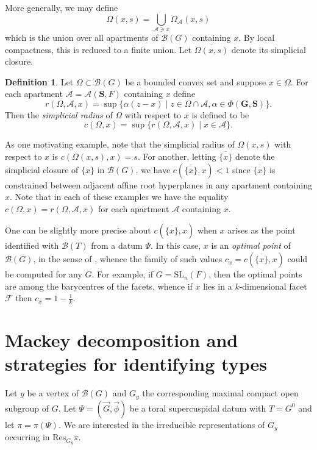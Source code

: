 \documentclass[12pt]{amsart}
\newcommand{\Res}{\mathrm{Res}} %
\newcommand{\ratk}{F}
\newcommand{\SL}{\mathrm{SL}}
\newcommand{\GG}{\mathbf{G}} %
\newcommand{\Stor}{\mathbf{S}} %
\newcommand{\Bset}{\Omega}
\newcommand{\apart}{{\mathcal{A}}}
\newcommand{\buil}{\mathcal{B}}
\newcommand{\F}{\mathcal{F}} %
\theoremstyle{plain}
\theoremstyle{definition}
\newtheorem{definition}[theorem]{Definition}
\theoremstyle{remark}
\numberwithin{equation}{section}
\numberwithin{figure}{section}
\begin{document}
More generally, we may define
$$
\Bset(x,s) = \bigcup_{\apart \ni x} \Omega_\apart(x,s)
$$
which is the union over all apartments of $\buil(G)$ containing $x$.  By local compactness, this is reduced to a finite union.  Let $\overline{\Bset(x,s)}$ denote its simplicial closure.

\begin{definition}\label{Def:simplicialradius}
Let $\Bset \subset \buil(G)$ be a bounded convex set and suppose $x\in \Bset$.  For each apartment $\apart = \apart(\Stor,\ratk)$ containing $x$ define
$$
r(\Bset, \apart, x) = \sup\{\alpha(z-x) \mid z \in \Bset\cap\apart, \alpha \in \Phi(\GG,\Stor)\}.
$$
Then the \emph{simplicial radius} of $\Bset$ with respect to $x$ is defined to be
$$
c(\Bset,x)  = \sup\{r(\Bset, \apart, x) \mid x \in \apart\}.
$$
\end{definition}

As one motivating example, note that the simplicial radius of $\Bset(x,s)$ with respect to $x$ is $c(\Bset(x,s),x)=s$. For another, letting $\overline{\{x\}}$ denote the simplicial closure of $\{x\}$ in $\buil(G)$, we have $c(\overline{\{x\}},x)<1$ since 
$\overline{\{x\}}$ is constrained between adjacent affine root hyperplanes in any apartment containing $x$.  Note that in each of these examples we have the equality $c(\Bset,x)=r(\Bset,\apart,x)$ for each apartment $\apart$ containing $x$.

One can be slightly more precise about $c(\overline{\{x\}},x)$ when $x$ arises as the point identified with $\buil(T)$ from a datum $\Psi$.  In this case, $x$ is an \emph{optimal point} of $\buil(G)$, in the sense of \cite[\S6.1]{MoyPrasad1994}, whence the family of such values $c_x=c(\overline{\{x\}}, x)$ could be computed for any $G$.  For example, if $G=\SL_n(\ratk)$, then the optimal points are among the barycentres of the facets, whence if $x$ lies in a $k$-dimensional facet $\F$ then $c_x= 1-\frac1k$.



\section{Mackey decomposition and strategies for identifying types}\label{S:Mackey}

Let $y$ be a vertex of $\buil(G)$ and $G_y$ the corresponding maximal compact open subgroup of $G$.  Let $\Psi = (\vec{G},\vec{\phi})$ be a toral supercuspidal datum with $T=G^0$ and let $\pi = \pi(\Psi)$.  We are interested in the irreducible representations of $G_y$ occurring in $\Res_{G_y}\pi$.
\end{document}
